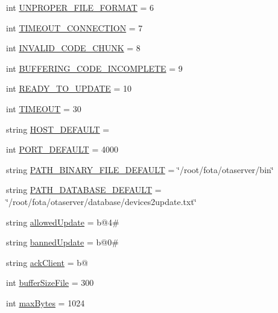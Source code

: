 \begin{DoxyCompactItemize}
int \hyperlink{namespaceserver_ae355ef915b96ba835f2a760f4b441679}{U\+N\+P\+R\+O\+P\+E\+R\+\_\+\+F\+I\+L\+E\+\_\+\+F\+O\+R\+M\+AT} = 6
\item 
int \hyperlink{namespaceserver_a91d094730b5907a9e14d0f4098b490b9}{T\+I\+M\+E\+O\+U\+T\+\_\+\+C\+O\+N\+N\+E\+C\+T\+I\+ON} = 7
\item 
int \hyperlink{namespaceserver_a4782abb5e785dbf608b8b8d553bbac12}{I\+N\+V\+A\+L\+I\+D\+\_\+\+C\+O\+D\+E\+\_\+\+C\+H\+U\+NK} = 8
\item 
int \hyperlink{namespaceserver_aabc8079ca922bed2eba00ad2cbc5d354}{B\+U\+F\+F\+E\+R\+I\+N\+G\+\_\+\+C\+O\+D\+E\+\_\+\+I\+N\+C\+O\+M\+P\+L\+E\+TE} = 9
\item 
int \hyperlink{namespaceserver_a1da647756067c40eea52b91451e82ad5}{R\+E\+A\+D\+Y\+\_\+\+T\+O\+\_\+\+U\+P\+D\+A\+TE} = 10
\item 
int \hyperlink{namespaceserver_abcf4d8f2c33b95345413f5e15c24a01e}{T\+I\+M\+E\+O\+UT} = 30
\item 
string \hyperlink{namespaceserver_abad27332b11c625d6b59b5fc1ca4b2b2}{H\+O\+S\+T\+\_\+\+D\+E\+F\+A\+U\+LT} = \textquotesingle{}\textquotesingle{}
\item 
int \hyperlink{namespaceserver_aa0fba16fbbcb0260d63ddce950cecb42}{P\+O\+R\+T\+\_\+\+D\+E\+F\+A\+U\+LT} = 4000
\item 
string \hyperlink{namespaceserver_a064d84330983ae4788826100a0238c78}{P\+A\+T\+H\+\_\+\+B\+I\+N\+A\+R\+Y\+\_\+\+F\+I\+L\+E\+\_\+\+D\+E\+F\+A\+U\+LT} = \char`\"{}/root/fota/otaserver/bin\char`\"{}
\item 
string \hyperlink{namespaceserver_aa3f9ad91c62b5372a5e677c50b853605}{P\+A\+T\+H\+\_\+\+D\+A\+T\+A\+B\+A\+S\+E\+\_\+\+D\+E\+F\+A\+U\+LT} = \char`\"{}/root/fota/otaserver/database/devices2update.\+txt\char`\"{}
\item 
string \hyperlink{namespaceserver_a097162d68fd6d2855bf5eb81507db414}{allowed\+Update} = b\textquotesingle{}@4\#\textquotesingle{}
\item 
string \hyperlink{namespaceserver_ae86ca5f489b3b8161c0ab91cbef0d8e6}{banned\+Update} = b\textquotesingle{}@0\#\textquotesingle{}
\item 
string \hyperlink{namespaceserver_ad00458dfe9ab743680203b756f8345bf}{ack\+Client} = b\textquotesingle{}@\textquotesingle{}
\item 
int \hyperlink{namespaceserver_a49c2646e7b6a517fe077d830219c58d4}{buffer\+Size\+File} = 300
\item 
int \hyperlink{namespaceserver_a100b5332a3005033a437d4240302698d}{max\+Bytes} = 1024

\end{DoxyCompactItemize}
